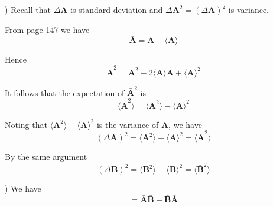 


) Recall that $\Delta\mathbf A$ is standard deviation and $\Delta\mathbf A^2=(\Delta\mathbf A)^2$ is variance.

\bigskip
From page 147 we have
\begin{equation*}
\bar{\mathbf A}=\mathbf A-\langle\mathbf A\rangle
\tag{1}
\end{equation*}

Hence
\begin{equation*}
\bar{\mathbf A}^2=\mathbf A^2-2\langle\mathbf A\rangle\mathbf A+\langle\mathbf A\rangle^2
\end{equation*}

It follows that the expectation of $\bar{\mathbf A}^2$ is
\begin{equation*}
\langle\bar{\mathbf A}^2\rangle
=\langle\mathbf A^2\rangle-\langle\mathbf A\rangle^2
\end{equation*}

Noting that $\langle\mathbf A^2\rangle-\langle\mathbf A\rangle^2$ is the variance of $\mathbf A$, we have
\begin{equation*}
(\Delta\mathbf A)^2=\langle\mathbf A^2\rangle-\langle\mathbf A\rangle^2=\langle\bar{\mathbf A}^2\rangle
\end{equation*}

\bigskip
By the same argument
\begin{equation*}
(\Delta\mathbf B)^2=\langle\mathbf B^2\rangle-\langle\mathbf B\rangle^2=\langle\bar{\mathbf B}^2\rangle
\end{equation*}

) We have
\begin{equation*}
[\bar{\mathbf A},\bar{\mathbf B}]=\bar{\mathbf A}\bar{\mathbf B}-\bar{\mathbf B}\bar{\mathbf A}
\end{equation*}

